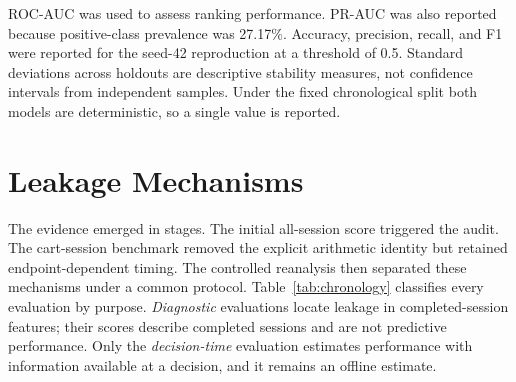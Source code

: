 \documentclass[conference, letterpaper]{IEEEtran}
\begin{document}
ROC-AUC was used to assess ranking performance. PR-AUC was also reported because positive-class prevalence was 27.17\%. Accuracy, precision, recall, and F1 were reported for the seed-42 reproduction at a threshold of 0.5. Standard deviations across holdouts are descriptive stability measures, not confidence intervals from independent samples. Under the fixed chronological split both models are deterministic, so a single value is reported.

\section{Leakage Mechanisms}
The evidence emerged in stages. The initial all-session score triggered the audit. The cart-session benchmark removed the explicit arithmetic identity but retained endpoint-dependent timing. The controlled reanalysis then separated these mechanisms under a common protocol. Table~\ref{tab:chronology} classifies every evaluation by purpose. \emph{Diagnostic} evaluations locate leakage in completed-session features; their scores describe completed sessions and are not predictive performance. Only the \emph{decision-time} evaluation estimates performance with information available at a decision, and it remains an offline estimate.
\end{document}
